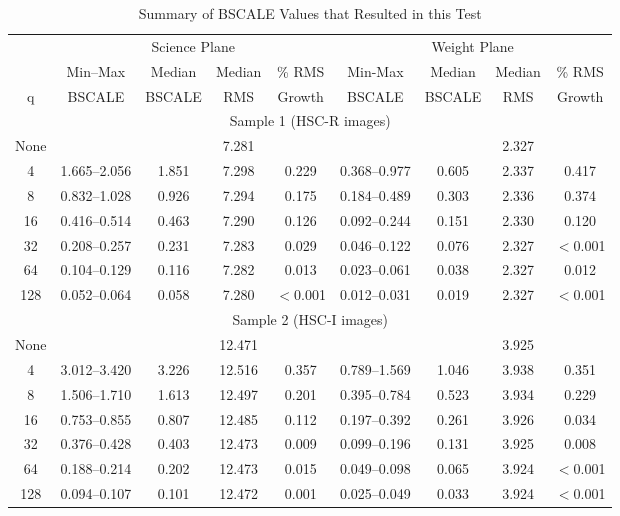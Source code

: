 \begin{table}
\caption{Summary of BSCALE Values that Resulted in this Test}
\footnotesize
\centering
\begin{tabular}[]{c|cccc|cccc}
\hline
        &  \multicolumn{4}{c}{Science Plane} & \multicolumn{4}{c}{Weight Plane} \\
        &   Min--Max & Median & Median & \% RMS  & Min-Max & Median & Median &  \% RMS \\
 q      &    BSCALE  & BSCALE &  RMS   & Growth  &  BSCALE & BSCALE & RMS    &  Growth \\
\hline
\multicolumn{9}{c}{Sample 1 (HSC-R images)}  \\
\hline
 None   &              &       & 7.281  &         &              &       & 2.327 &          \\
    4   & 1.665--2.056 & 1.851 & 7.298  & 0.229 & 0.368--0.977 & 0.605 & 2.337 & 0.417  \\
    8   & 0.832--1.028 & 0.926 & 7.294  & 0.175 & 0.184--0.489 & 0.303 & 2.336 & 0.374  \\
   16   & 0.416--0.514 & 0.463 & 7.290  & 0.126 & 0.092--0.244 & 0.151 & 2.330 & 0.120  \\
   32   & 0.208--0.257 & 0.231 & 7.283  & 0.029 & 0.046--0.122 & 0.076 & 2.327 & $<$0.001  \\
   64   & 0.104--0.129 & 0.116 & 7.282  & 0.013 & 0.023--0.061 & 0.038 & 2.327 & 0.012  \\
  128   & 0.052--0.064 & 0.058 & 7.280  & $<$0.001 & 0.012--0.031 & 0.019 & 2.327 & $<$0.001  \\
\hline 
\multicolumn{9}{c}{Sample 2 (HSC-I images)}  \\
\hline
 None   &              &       & 12.471 &         &              &       & 3.925 &          \\
    4   & 3.012--3.420 & 3.226 & 12.516 & 0.357 & 0.789--1.569 & 1.046 & 3.938 & 0.351  \\
    8   & 1.506--1.710 & 1.613 & 12.497 & 0.201 & 0.395--0.784 & 0.523 & 3.934 & 0.229  \\
   16   & 0.753--0.855 & 0.807 & 12.485 & 0.112 & 0.197--0.392 & 0.261 & 3.926 & 0.034  \\
   32   & 0.376--0.428 & 0.403 & 12.473 & 0.009 & 0.099--0.196 & 0.131 & 3.925 & 0.008  \\
   64   & 0.188--0.214 & 0.202 & 12.473 & 0.015 & 0.049--0.098 & 0.065 & 3.924 & $<$0.001  \\
  128   & 0.094--0.107 & 0.101 & 12.472 & 0.001 & 0.025--0.049 & 0.033 & 3.924 & $<$0.001  \\
\hline
\end{tabular}
\label{tab_bscale}
\end{table}

